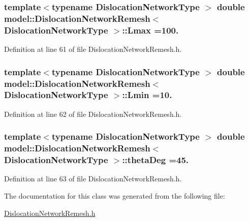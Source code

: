 \subsubsection[{Lmax}]{\setlength{\rightskip}{0pt plus 5cm}template$<$typename Dislocation\+Network\+Type $>$ double {\bf model\+::\+Dislocation\+Network\+Remesh}$<$ Dislocation\+Network\+Type $>$\+::Lmax =100.\hspace{0.3cm}{\ttfamily [static]}}\label{classmodel_1_1_dislocation_network_remesh_a3910c36b3b1e9e6cfa221a690bb718ff}


Definition at line 61 of file Dislocation\+Network\+Remesh.\+h.

\hypertarget{classmodel_1_1_dislocation_network_remesh_a213548900347aaa2714e30ea01560ae5}{}
\subsubsection[{Lmin}]{\setlength{\rightskip}{0pt plus 5cm}template$<$typename Dislocation\+Network\+Type $>$ double {\bf model\+::\+Dislocation\+Network\+Remesh}$<$ Dislocation\+Network\+Type $>$\+::Lmin =10.\hspace{0.3cm}{\ttfamily [static]}}\label{classmodel_1_1_dislocation_network_remesh_a213548900347aaa2714e30ea01560ae5}


Definition at line 62 of file Dislocation\+Network\+Remesh.\+h.

\hypertarget{classmodel_1_1_dislocation_network_remesh_a34e7e6e6f0b15cd2befe6fc9a858cbe5}{}
\subsubsection[{theta\+Deg}]{\setlength{\rightskip}{0pt plus 5cm}template$<$typename Dislocation\+Network\+Type $>$ double {\bf model\+::\+Dislocation\+Network\+Remesh}$<$ Dislocation\+Network\+Type $>$\+::theta\+Deg =45.\hspace{0.3cm}{\ttfamily [static]}}\label{classmodel_1_1_dislocation_network_remesh_a34e7e6e6f0b15cd2befe6fc9a858cbe5}


Definition at line 63 of file Dislocation\+Network\+Remesh.\+h.



The documentation for this class was generated from the following file\+:\begin{DoxyCompactItemize}
\item 
\hyperlink{_dislocation_network_remesh_8h}{Dislocation\+Network\+Remesh.\+h}\end{DoxyCompactItemize}
